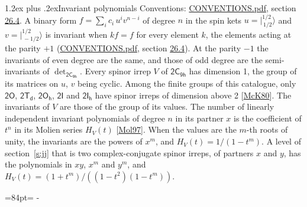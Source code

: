 \documentclass[10pt,a4paper]{article}
\makeatletter
\renewcommand\section{\@startsection{section}{1}{\z@}{-3ex plus -1ex minus -.2ex}%
  {1.2ex plus .2ex}{\normalfont\large\sffamily\bfseries\color{parttitle}}}
\newcommand{\needspace}[1]{\par\penalty-100\begingroup\dimen0=#1\relax\dimen2=\pagegoal
  \advance\dimen2-\pagetotal\ifdim\dimen0>\dimen2\relax\ifdim\dimen2>0pt\vfil\break\fi\fi
  \endgroup}
\numberwithin{equation}{section}
\newcommand{\grp}[1]{\mathsf{#1}}
\newcommand{\jm}[2]{\bigl\lvert{}^{#1}_{\,#2}\bigr\rangle}
\makeatother
\begin{document}
\section{Invariant polynomials}\label{s:invariants}
Conventions: \href{../../CONVENTIONS.pdf}{CONVENTIONS.pdf}, section \href{../../CONVENTIONS.pdf\#conv.26.4}{26.4}.
\leavevmode\label{n:local.binary.form}A binary form $f = \sum_i c_i\, u^i v^{n-i}$ of degree $n$ in the spin kets $u = \jm{1/2}{1/2}$ and $v = \jm{1/2}{-1/2}$ is invariant when $k f = f$ for every element $k$, the elements acting at the parity $+1$ (\href{../../CONVENTIONS.pdf}{CONVENTIONS.pdf}, section \href{../../CONVENTIONS.pdf\#conv.26.4}{26.4}). At the parity $-1$ the invariants of even degree are the same, and those of odd degree are the semi-invariants of $\det_{\grp{2C_{9h}}}$.
\leavevmode\label{n:function.hilbert}Every spinor irrep $V$ of $\grp{2C_{9h}}$ has dimension 1, the group of its matrices on $u$, $v$ being cyclic. Among the finite groups of this catalogue, only $\grp{2O}$, $\grp{2T_{d}}$, $\grp{2O_{h}}$, $\grp{2I}$ and $\grp{2I_{h}}$ have spinor irreps of dimension above 2 [\href{../../../REFERENCES.pdf\#ref.McK80}{McK80}]. The invariants of $V$ are those of the group of its values. \label{n:local.partner.x}The number of linearly independent invariant polynomials of degree $n$ in its partner $x$ is the coefficient of $t^n$ in its Molien series $H_V(t)$ [\href{../../../REFERENCES.pdf\#ref.Mol97}{Mol97}]. When the values are the $m$-th roots of unity, the invariants are the powers of $x^{m}$, and $H_V(t) = 1/(1 - t^{m})$. A level of section~\ref{s:jj} that is two complex-conjugate spinor irreps, of partners $x$ and $y$, has the polynomials in $xy$, $x^{m}$ and $y^{m}$, and $H_V(t) = (1 + t^{m})/((1 - t^{2})(1 - t^{m}))$.
\needspace{84pt}
\end{document}
